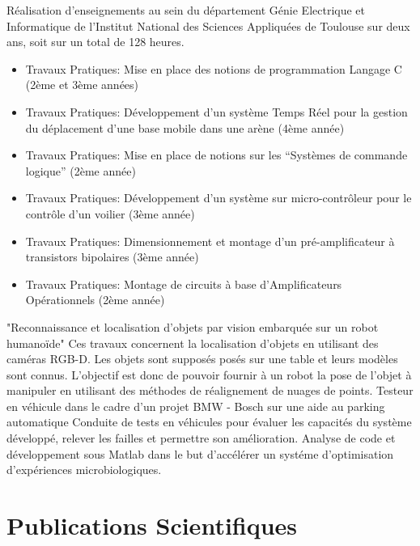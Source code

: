 \documentclass[11pt,a4paper,sans]{moderncv}         %
\begin{document}
%
{}{
  R\'ealisation d'enseignements au sein du d\'epartement G\'enie Electrique et Informatique de l'Institut National des Sciences Appliqu\'ees de Toulouse sur deux ans, soit sur un total de 128 heures.
  \begin{itemize}
    \item Travaux Pratiques: Mise en place des notions de programmation Langage C (2\`eme et 3\`eme ann\'ees)
    \item Travaux Pratiques: D\'eveloppement d'un syst\`eme Temps R\'eel pour la gestion du d\'eplacement d'une base mobile dans une ar\`ene (4\`eme ann\'ee)
    \item Travaux Pratiques: Mise en place de notions sur les ``Syst\`emes de commande logique'' (2\`eme ann\'ee)
    \item Travaux Pratiques: D\'eveloppement d'un syst\`eme sur micro-contr\^oleur pour le contr\^ole d'un voilier (3\`eme ann\'ee)
    \item Travaux Pratiques: Dimensionnement et montage d'un pr\'e-amplificateur \`a transistors bipolaires (3\`eme ann\'ee)
    \item Travaux Pratiques: Montage de circuits \`a base d'Amplificateurs Op\'erationnels (2\`eme ann\'ee)
  \end{itemize}
}
%
{"Reconnaissance et localisation d'objets par vision embarqu\'ee sur un robot humano\"ide"}{
  Ces travaux concernent la localisation d'objets en utilisant des cam\'eras RGB-D.
Les objets sont suppos\'es pos\'es sur une table et leurs mod\`eles sont connus.
L'objectif est donc de pouvoir fournir \`a un robot la pose de l'objet \`a manipuler en utilisant des m\'ethodes de r\'ealignement de nuages de points.
}
%
{Testeur en v\'ehicule dans le cadre d'un projet BMW - Bosch sur une aide au parking automatique}{
  Conduite de tests en v\'ehicules pour \'evaluer les capacit\'es du syst\`eme d\'evelopp\'e, relever les failles et permettre son am\'elioration.
}
%
{Analyse de code et d\'eveloppement sous Matlab dans le but d'acc\'el\'erer un syst\'eme d'optimisation d'exp\'eriences microbiologiques.
}

\section{Publications Scientifiques}
\end{document}
